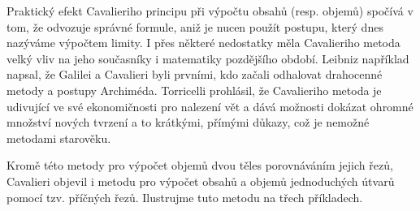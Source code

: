       Praktický efekt Cavalieriho principu při výpočtu obsahů (resp. objemů) spočívá v tom, že
      odvozuje správné formule, aniž je nucen použít postupu, který dnes nazýváme výpočtem limity. I
      přes některé nedostatky měla Cavalieriho metoda velký vliv na jeho současníky i matematiky
      pozdějšího období. Leibniz například napsal, že Galilei a Cavalieri byli prvními, kdo začali
      odhalovat drahocenné metody a postupy Archiméda. Torricelli prohlásil, že Cavalieriho metoda
      je udivující ve své ekonomičnosti pro nalezení vět a dává možnosti dokázat ohromné množství
      nových tvrzení a to krátkými, přímými důkazy, což je nemožné metodami starověku.

      Kromě této metody pro výpočet objemů dvou těles porovnáváním jejich řezů, Cavalieri objevil i
      metodu pro výpočet obsahů a objemů jednoduchých útvarů pomocí tzv. příčných řezů. Ilustrujme
      tuto metodu na třech příkladech.

